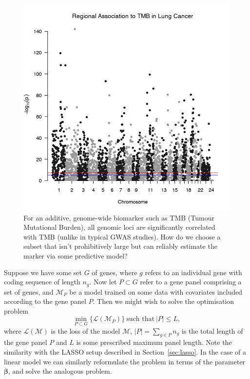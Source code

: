 \documentclass[thesis.tex]{subfiles}
\begin{document}
\begin{figure}[htbp]
\centering
\includegraphics[width=5in]{figures/chapter1/lungmanhat.png}
\caption{For an additive, genome-wide biomarker such as TMB (Tumour Mutational Burden), all genomic loci are significantly correlated with TMB (unlike in typical GWAS studies). How do we choose a subset that isn't prohibitively large but can reliably estimate the marker via some predictive model? \label{fig:lungmanhat}}
\end{figure}

Suppose we have some set $G$ of genes, where $g$ refers to an individual gene with coding sequence of length $n_g$. Now let $P \subset G$ refer to a gene panel comprising a set of genes, and $\mathcal{M}_P$ be a model trained on some data with covariates included according to the gene panel $P$. Then we might wish to solve the optimisation problem 
\begin{equation}
\min_{P \subset G} \{\mathcal{L}(\mathcal{M}_P) \} \ \text{such that} \ |P| \leq L,
\end{equation} 
where $\mathcal{L}(\mathcal{M})$ is the loss of the model $\mathcal{M}$, $|P| = \sum\limits_{g \in P}n_g$ is the total length of the gene panel $P$ and $L$ is some prescribed maximum panel length. Note the similarity with the LASSO setup described in Section~\ref{sec:lasso}. In the case of a linear model we can similarly reformulate the problem in terms of the parameter $\mathbf{\beta}$, and solve the analogous problem. \\ ~ \\
\end{document}
